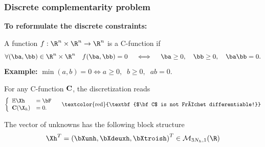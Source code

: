 \documentclass[10 pt]{beamer}
\begin{document}
\begin{frame}
\frametitle{Discrete complementarity problem}
\alert{\textbf{To reformulate the discrete constraints:}}
\begin{definition}
A function $f: {{\R}^n \times \R^n} \rightarrow \R^n$ is a C-function if
\begin{equation*}
\forall(\ba,\bb)\in {\R}^n \times \R^n \quad f(\ba,\bb)=0 \quad \iff \quad
\ba \geq0, \quad \bb \geq0, \quad \ba \bb=0.
\end{equation*}
\textcolor{cadmiumgreen}{\textbf{Example:}} $\min(a,b) = 0 \iff a \geq 0, \; \; b \geq 0, \; \; ab=0.$
\end{definition}
For any C-function ${\bf C}$, the discretization reads 
\begin{equation*}
\left\lbrace\begin{array}{llccc}
 \mathbb{E}\Xh &= \bF\\
{\bf C}(\X_h)&=0.
\end{array}
\right.
\quad \mbox{\textcolor{red}{\textbf{$\bf C$ is not Fréchet differentiable!}}}
\end{equation*}

%
The vector of unknowns has the following block structure
\begin{equation*}
\Xh^{T}=
\left(\bXunh, \bXdeuxh, \bXtroish\right)^{T} \in \mathcal{M}_{3N_h,1}(\R)
\end{equation*}
\end{frame}
\end{document}
